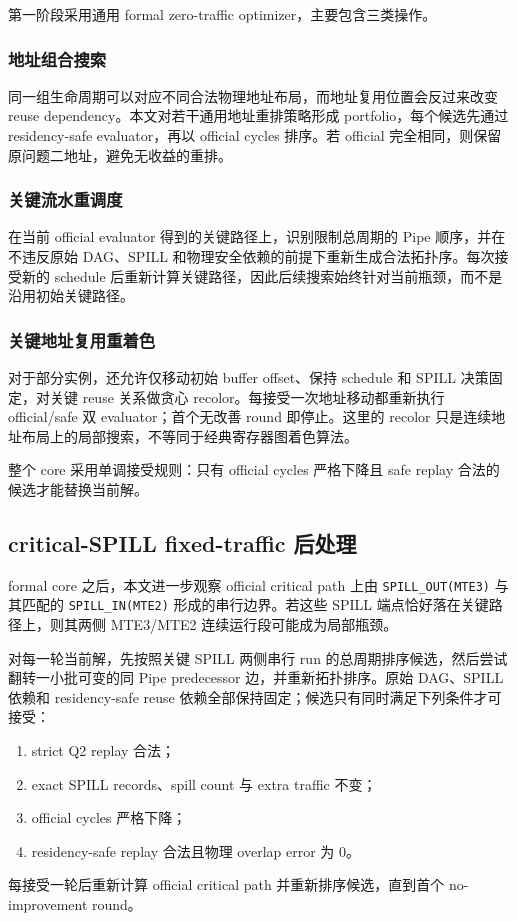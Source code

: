 第一阶段采用通用 formal zero-traffic optimizer，主要包含三类操作。

\subsubsection{地址组合搜索}

同一组生命周期可以对应不同合法物理地址布局，而地址复用位置会反过来改变 reuse dependency。本文对若干通用地址重排策略形成 portfolio，每个候选先通过 residency-safe evaluator，再以 official cycles 排序。若 official 完全相同，则保留原问题二地址，避免无收益的重排。

\subsubsection{关键流水重调度}

在当前 official evaluator 得到的关键路径上，识别限制总周期的 Pipe 顺序，并在不违反原始 DAG、SPILL 和物理安全依赖的前提下重新生成合法拓扑序。每次接受新的 schedule 后重新计算关键路径，因此后续搜索始终针对当前瓶颈，而不是沿用初始关键路径。

\subsubsection{关键地址复用重着色}

对于部分实例，还允许仅移动初始 buffer offset、保持 schedule 和 SPILL 决策固定，对关键 reuse 关系做贪心 recolor。每接受一次地址移动都重新执行 official/safe 双 evaluator；首个无改善 round 即停止。这里的 recolor 只是连续地址布局上的局部搜索，不等同于经典寄存器图着色算法。

整个 core 采用单调接受规则：只有 official cycles 严格下降且 safe replay 合法的候选才能替换当前解。

\subsection{critical-SPILL fixed-traffic 后处理}

formal core 之后，本文进一步观察 official critical path 上由 \texttt{SPILL\_OUT(MTE3)} 与其匹配的 \texttt{SPILL\_IN(MTE2)} 形成的串行边界。若这些 SPILL 端点恰好落在关键路径上，则其两侧 MTE3/MTE2 连续运行段可能成为局部瓶颈。

对每一轮当前解，先按照关键 SPILL 两侧串行 run 的总周期排序候选，然后尝试翻转一小批可变的同 Pipe predecessor 边，并重新拓扑排序。原始 DAG、SPILL 依赖和 residency-safe reuse 依赖全部保持固定；候选只有同时满足下列条件才可接受：
\begin{enumerate}[label=(\arabic*)]
    \item strict Q2 replay 合法；
    \item exact SPILL records、spill count 与 extra traffic 不变；
    \item official cycles 严格下降；
    \item residency-safe replay 合法且物理 overlap error 为 0。
\end{enumerate}
每接受一轮后重新计算 official critical path 并重新排序候选，直到首个 no-improvement round。

